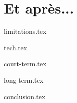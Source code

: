 \part{Et après...}\label{part:et-apres...}

{limitations.tex}

{tech.tex}

{court-term.tex}

{long-term.tex}

{conclusion.tex}